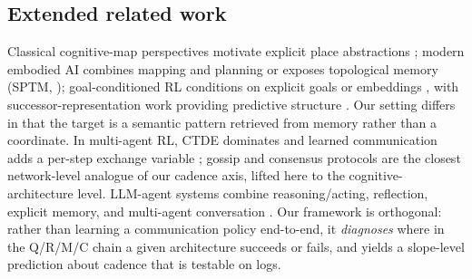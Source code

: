\documentclass{article}
\begin{document}
\subsection{Extended related work}
\label{app:related-work-extended}

Classical cognitive-map perspectives motivate explicit place abstractions \citep{tolman1948cognitive,okeefe1978hippocampus,kuipers2000spatial}; modern embodied AI combines mapping and planning \citep{gupta2017cognitive} or exposes topological memory (SPTM, \citealp{savinov2018semi}); goal-conditioned RL conditions on explicit goals or embeddings \citep{andrychowicz2017hindsight,ghosh2021learning}, with successor-representation work providing predictive structure \citep{dayan1993improving,stachenfeld2017hippocampus,momennejad2017successor}. Our setting differs in that the target is a semantic pattern retrieved from memory rather than a coordinate. In multi-agent RL, CTDE dominates \citep{lowe2017maddpg,foerster2018ctde} and learned communication adds a per-step exchange variable \citep{sukhbaatar2016commnet,foerster2016learning}; gossip and consensus protocols \citep{boyd2006gossip,xiao2007distributed} are the closest network-level analogue of our cadence axis, lifted here to the cognitive-architecture level. LLM-agent systems combine reasoning/acting, reflection, explicit memory, and multi-agent conversation \citep{yao2022react,shinn2023reflexion,wang2023voyager,park2023generative,wu2023autogen,packer2023memgpt,chhikara2025mem0}. Our framework is orthogonal: rather than learning a communication policy end-to-end, it \emph{diagnoses} where in the Q/R/M/C chain a given architecture succeeds or fails, and yields a slope-level prediction about cadence that is testable on logs.
\end{document}
